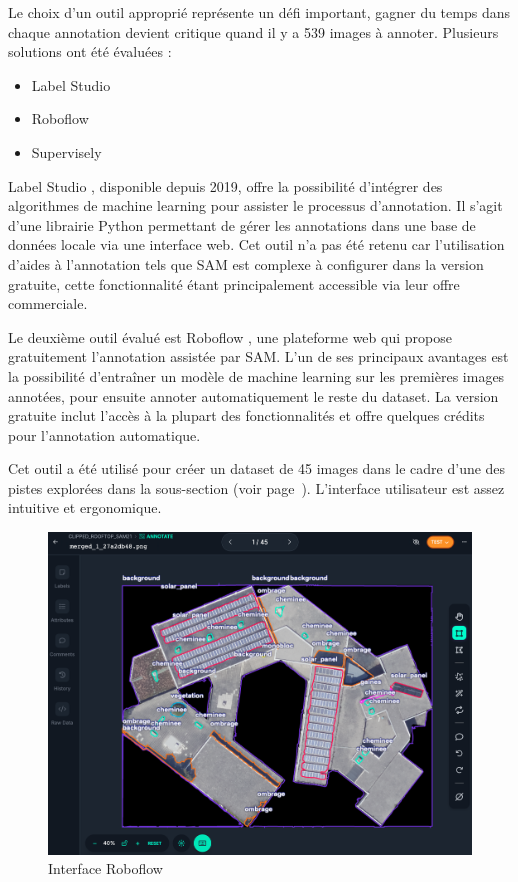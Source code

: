 Le choix d'un outil approprié représente un défi important, gagner du temps dans chaque annotation devient critique quand il y a 539 images à annoter. Plusieurs solutions ont été évaluées :
\begin{itemize}
    \item Label Studio \cite{label_studio_open_nodate}
    \item Roboflow \cite{roboflow_roboflow_nodate}
    \item Supervisely \cite{supervisely_supervisely_nodate}
\end{itemize}

Label Studio \cite{label_studio_open_nodate}, disponible depuis 2019, offre la possibilité d'intégrer des algorithmes de machine learning pour assister le processus d'annotation. Il s'agit d'une librairie Python permettant de gérer les annotations dans une base de données locale via une interface web. Cet outil n'a pas été retenu car l'utilisation d'aides à l'annotation tels que SAM \cite{label_studio_label_nodate} est complexe à configurer dans la version gratuite, cette fonctionnalité étant principalement accessible via leur offre commerciale.

Le deuxième outil évalué est Roboflow \cite{roboflow_roboflow_nodate}, une plateforme web qui propose gratuitement l'annotation assistée par SAM. L'un de ses principaux avantages est la possibilité d'entraîner un modèle de machine learning sur les premières images annotées, pour ensuite annoter automatiquement le reste du dataset. La version gratuite inclut l'accès à la plupart des fonctionnalités et offre quelques crédits pour l'annotation automatique.

Cet outil a été utilisé pour créer un dataset de 45 images dans le cadre d'une des pistes explorées dans la sous-section \textit{} (voir page~\pageref{subsubsec:fine_tuning_sam}). L'interface utilisateur est assez intuitive et ergonomique.

\begin{figure}[H]
    \centering
    \includegraphics[width=1\linewidth]{02-main//figures//ch3/ch3_labellisation_01_outils_01_robolfow.png}
    \caption{Interface Roboflow}
    \label{fig:ch3_labellisation_01_outils_01_robolfow}
\end{figure}

